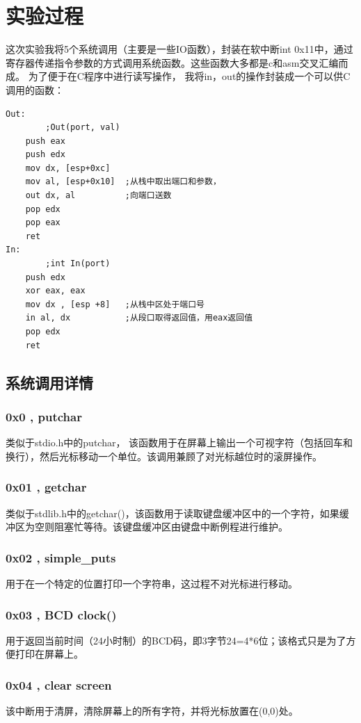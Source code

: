 \documentclass[a4paper,11pt,UTF8]{ctexart}
\begin{document}
\section{实验过程}
	这次实验我将5个系统调用（主要是一些IO函数），封装在软中断int 0x11中，通过寄存器传递指令参数的方式调用系统函数。这些函数大多都是c和asm交叉汇编而成。
	为了便于在C程序中进行读写操作， 我将in，out的操作封装成一个可以供C调用的函数：
	\begin{lstlisting}[language=={[x86masm]Assembler},caption={In ,Out for C},keywordstyle=\color{blue!70},commentstyle=\color{red!50!green!50!blue!50},frame=shadowbox, rulesepcolor=\color{red!20!green!20!blue!20}]
Out:
		;Out(port, val)
	push eax
	push edx
	mov dx, [esp+0xc]
	mov al, [esp+0x10]	;从栈中取出端口和参数，
	out dx, al			;向端口送数
	pop edx
	pop eax
	ret
In:
		;int In(port)
	push edx
	xor eax, eax
	mov dx , [esp +8]   ;从栈中区处于端口号
	in al, dx			;从段口取得返回值，用eax返回值
	pop edx
	ret 

	\end{lstlisting}
	\subsection{系统调用详情}
		\subsubsection{0x0 , putchar}
			类似于stdio.h中的putchar， 该函数用于在屏幕上输出一个可视字符（包括回车和换行），然后光标移动一个单位。该调用兼顾了对光标越位时的滚屏操作。
		\subsubsection{0x01 , getchar}
			类似于stdlib.h中的getchar()，该函数用于读取键盘缓冲区中的一个字符，如果缓冲区为空则阻塞忙等待。该键盘缓冲区由键盘中断例程进行维护。
		\subsubsection{0x02 , simple\_puts}
			用于在一个特定的位置打印一个字符串，这过程不对光标进行移动。
		\subsubsection{0x03 , BCD clock()}
			用于返回当前时间（24小时制）的BCD码，即3字节24=4*6位；该格式只是为了方便打印在屏幕上。
		\subsubsection{0x04 , clear screen}
			该中断用于清屏，清除屏幕上的所有字符，并将光标放置在(0,0)处。
\end{document}
